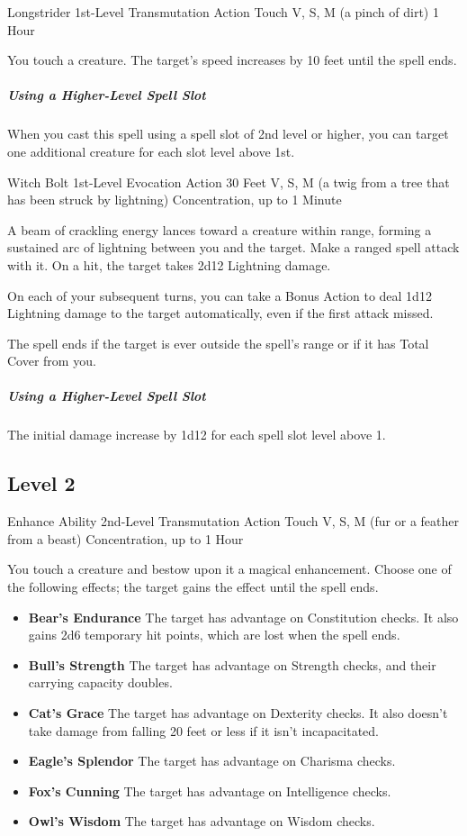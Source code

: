 \documentclass[letterpaper,openany,oneside,twocolumn]{book}
\begin{document}
\DndSpellHeader
  {Longstrider}
  {1st-Level Transmutation}
  {Action}
  {Touch}
  {V, S, M (a pinch of dirt)}
  {1 Hour}

You touch a creature. The target's speed increases by 10 feet until the spell ends.

\subparagraph*{Using a Higher-Level Spell Slot} When you cast this spell using a spell slot of 2nd level or higher, you can target one additional creature for each slot level above 1st.

\DndSpellHeader
  {Witch Bolt}
  {1st-Level Evocation}
  {Action}
  {30 Feet}
  {V, S, M (a twig from a tree that has been struck by lightning)}
  {Concentration, up to 1 Minute}

A beam of crackling energy lances toward a creature within range, forming a sustained arc of lightning between you and the target. Make a ranged spell attack with it. On a hit, the target takes 2d12 Lightning damage.

On each of your subsequent turns, you can take a Bonus Action to deal 1d12 Lightning damage to the target automatically, even if the first attack missed.

The spell ends if the target is ever outside the spell's range or if it has Total Cover from you.

\subparagraph*{Using a Higher-Level Spell Slot} The initial damage increase by 1d12 for each spell slot level above 1.

\subsection*{Level 2}

\DndSpellHeader
  {Enhance Ability}
  {2nd-Level Transmutation}
  {Action}
  {Touch}
  {V, S, M (fur or a feather from a beast)}
  {Concentration, up to 1 Hour}

You touch a creature and bestow upon it a magical enhancement. Choose one of the following effects; the target gains the effect until the spell ends.
\begin{itemize}
	\renewcommand\labelitemi{\textbf{\textbullet}}
	\item \textbf{Bear's Endurance} The target has advantage on Constitution checks. It also gains 2d6 temporary hit points, which are lost when the spell ends.
	\item \textbf{Bull's Strength} The target has advantage on Strength checks, and their carrying capacity doubles.
	\item \textbf{Cat's Grace} The target has advantage on Dexterity checks. It also doesn’t take damage from falling 20 feet or less if it isn't incapacitated.
	\item \textbf{Eagle's Splendor} The target has advantage on Charisma checks.
	\item \textbf{Fox's Cunning} The target has advantage on Intelligence checks.
	\item \textbf{Owl's Wisdom} The target has advantage on Wisdom checks.
\end{itemize}
\end{document}

